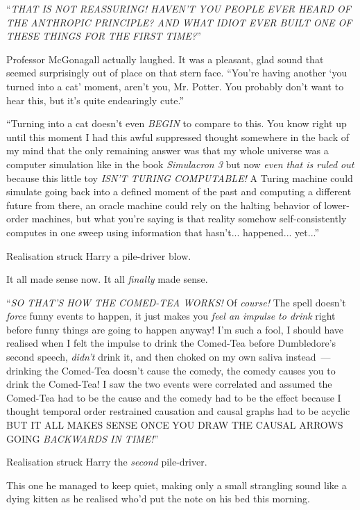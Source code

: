``\emph{THAT IS NOT REASSURING! HAVEN'T YOU PEOPLE EVER HEARD OF THE ANTHROPIC PRINCIPLE? AND WHAT IDIOT EVER BUILT ONE OF THESE THINGS FOR THE FIRST TIME?}''

Professor McGonagall actually laughed. It was a pleasant, glad sound that seemed surprisingly out of place on that stern face. ``You're having another `you turned into a cat' moment, aren't you, Mr. Potter. You probably don't want to hear this, but it's quite endearingly cute.''

``Turning into a cat doesn't even \emph{BEGIN} to compare to this. You know right up until this moment I had this awful suppressed thought somewhere in the back of my mind that the only remaining answer was that my whole universe was a computer simulation like in the book \emph{Simulacron 3} but now \emph{even that is ruled out} because this little toy \emph{ISN'T TURING COMPUTABLE!} A Turing machine could simulate going back into a defined moment of the past and computing a different future from there, an oracle machine could rely on the halting behavior of lower-order machines, but what you're saying is that reality somehow self-consistently computes in one sweep using information that hasn't... happened... yet...''

Realisation struck Harry a pile-driver blow.

It all made sense now. It all \emph{finally} made sense.

``\emph{SO THAT'S HOW THE COMED-TEA WORKS!} Of \emph{course!} The spell doesn't \emph{force} funny events to happen, it just makes you \emph{feel an impulse to drink} right before funny things are going to happen anyway! I'm such a fool, I should have realised when I felt the impulse to drink the Comed-Tea before Dumbledore's second speech, \emph{didn't} drink it, and then choked on my own saliva instead~--- drinking the Comed-Tea doesn't cause the comedy, the comedy causes you to drink the Comed-Tea! I saw the two events were correlated and assumed the Comed-Tea had to be the cause and the comedy had to be the effect because I thought temporal order restrained causation and causal graphs had to be acyclic BUT IT ALL MAKES SENSE ONCE YOU DRAW THE CAUSAL ARROWS GOING \emph{BACKWARDS IN TIME!}''

Realisation struck Harry the \emph{second} pile-driver.

This one he managed to keep quiet, making only a small strangling sound like a dying kitten as he realised who'd put the note on his bed this morning.

